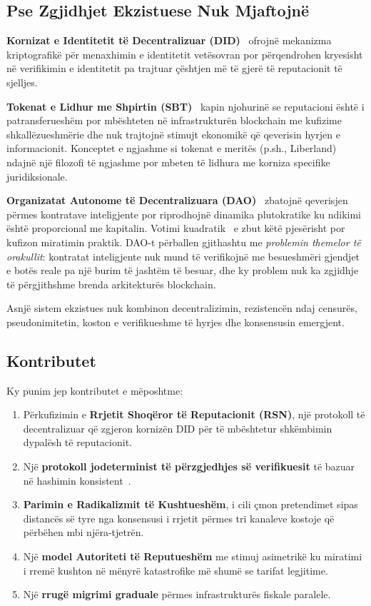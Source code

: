 \documentclass[11pt,a4paper,twocolumn]{article}
\begin{document}
\subsection{Pse Zgjidhjet Ekzistuese Nuk Mjaftojnë}

\textbf{Kornizat e Identitetit të Decentralizuar (DID)}~\cite{did2022} ofrojnë mekanizma kriptografikë për menaxhimin e identitetit vetësovran por përqendrohen kryesisht në verifikimin e identitetit pa trajtuar çështjen më të gjerë të reputacionit të sjelljes.

\textbf{Tokenat e Lidhur me Shpirtin (SBT)}~\cite{weyl2022} kapin njohurinë se reputacioni është i patransferueshëm por mbështeten në infrastrukturën blockchain me kufizime shkallëzueshmërie dhe nuk trajtojnë stimujt ekonomikë që qeverisin hyrjen e informacionit. Konceptet e ngjashme si tokenat e meritës (p.sh., Liberland) ndajnë një filozofi të ngjashme por mbeten të lidhura me korniza specifike juridiksionale.

\textbf{Organizatat Autonome të Decentralizuara (DAO)}~\cite{buterin2014} zbatojnë qeverisjen përmes kontratave inteligjente por riprodhojnë dinamika plutokratike ku ndikimi është proporcional me kapitalin. Votimi kuadratik~\cite{buterin2019} e zbut këtë pjesërisht por kufizon miratimin praktik. DAO-t përballen gjithashtu me \emph{problemin themelor të orakullit}: kontratat inteligjente nuk mund të verifikojnë me besueshmëri gjendjet e botës reale pa një burim të jashtëm të besuar, dhe ky problem nuk ka zgjidhje të përgjithshme brenda arkitekturës blockchain.

Asnjë sistem ekzistues nuk kombinon decentralizimin, rezistencën ndaj censurës, pseudonimitetin, koston e verifikueshme të hyrjes dhe konsensusin emergjent.

\subsection{Kontributet}

Ky punim jep kontributet e mëposhtme:
\begin{enumerate}[nosep]
\item Përkufizimin e \textbf{Rrjetit Shoqëror të Reputacionit (RSN)}, një protokoll të decentralizuar që zgjeron kornizën DID për të mbështetur shkëmbimin dypalësh të reputacionit.
\item Një \textbf{protokoll jodeterminist të përzgjedhjes së verifikuesit} të bazuar në hashimin konsistent~\cite{karger1997}.
\item \textbf{Parimin e Radikalizmit të Kushtueshëm}, i cili çmon pretendimet sipas distancës së tyre nga konsensusi i rrjetit përmes tri kanaleve kostoje që përbëhen mbi njëra-tjetrën.
\item Një \textbf{model Autoriteti të Reputueshëm} me stimuj asimetrikë ku miratimi i rremë kushton në mënyrë katastrofike më shumë se tarifat legjitime.
\item Një \textbf{rrugë migrimi graduale} përmes infrastrukturës fiskale paralele.
\end{enumerate}
\end{document}
